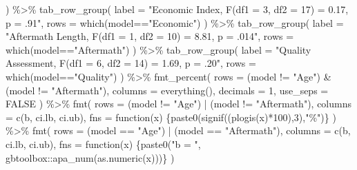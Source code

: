 \documentclass[
  letterpaper,
  DIV=11,
  numbers=noendperiod]{scrartcl}
\newenvironment{Shaded}{\begin{snugshade}}{\end{snugshade}}
\newcommand{\AttributeTok}[1]{\textcolor[rgb]{0.40,0.45,0.13}{#1}}
\newcommand{\ConstantTok}[1]{\textcolor[rgb]{0.56,0.35,0.01}{#1}}
\newcommand{\ControlFlowTok}[1]{\textcolor[rgb]{0.00,0.23,0.31}{#1}}
\newcommand{\DecValTok}[1]{\textcolor[rgb]{0.68,0.00,0.00}{#1}}
\newcommand{\FunctionTok}[1]{\textcolor[rgb]{0.28,0.35,0.67}{#1}}
\newcommand{\NormalTok}[1]{\textcolor[rgb]{0.00,0.23,0.31}{#1}}
\newcommand{\SpecialCharTok}[1]{\textcolor[rgb]{0.37,0.37,0.37}{#1}}
\newcommand{\StringTok}[1]{\textcolor[rgb]{0.13,0.47,0.30}{#1}}
\begin{document}
\begin{Shaded}
\begin{Highlighting}[]
\NormalTok{  ) }\SpecialCharTok{\%\textgreater{}\%}
    \FunctionTok{tab\_row\_group}\NormalTok{(}
    \AttributeTok{label =} \StringTok{"Economic Index, F(df1 = 3, df2 = 17) = 0.17, p = .91"}\NormalTok{,}
    \AttributeTok{rows =} \FunctionTok{which}\NormalTok{(model}\SpecialCharTok{==}\StringTok{"Economic"}\NormalTok{)}
\NormalTok{  ) }\SpecialCharTok{\%\textgreater{}\%}
    \FunctionTok{tab\_row\_group}\NormalTok{(}
    \AttributeTok{label =} \StringTok{"Aftermath Length, F(df1 = 1, df2 = 10) = 8.81, p = .014"}\NormalTok{,}
    \AttributeTok{rows =} \FunctionTok{which}\NormalTok{(model}\SpecialCharTok{==}\StringTok{"Aftermath"}\NormalTok{)}
\NormalTok{  ) }\SpecialCharTok{\%\textgreater{}\%}
  \FunctionTok{tab\_row\_group}\NormalTok{(}
    \AttributeTok{label =} \StringTok{"Quality Assessment, F(df1 = 6, df2 = 14) = 1.69, p = .20"}\NormalTok{,}
    \AttributeTok{rows =} \FunctionTok{which}\NormalTok{(model}\SpecialCharTok{==}\StringTok{"Quality"}\NormalTok{)}
\NormalTok{  ) }\SpecialCharTok{\%\textgreater{}\%}
   \FunctionTok{fmt\_percent}\NormalTok{(}
    \AttributeTok{rows     =}\NormalTok{ (model }\SpecialCharTok{!=} \StringTok{"Age"}\NormalTok{) }\SpecialCharTok{\&}\NormalTok{ (model }\SpecialCharTok{!=} \StringTok{"Aftermath"}\NormalTok{),}
    \AttributeTok{columns  =} \FunctionTok{everything}\NormalTok{(),}
    \AttributeTok{decimals =} \DecValTok{1}\NormalTok{,}
    \AttributeTok{use\_seps =} \ConstantTok{FALSE}
\NormalTok{  ) }\SpecialCharTok{\%\textgreater{}\%}
  \FunctionTok{fmt}\NormalTok{(}
    \AttributeTok{rows     =}\NormalTok{ (model }\SpecialCharTok{!=} \StringTok{"Age"}\NormalTok{) }\SpecialCharTok{|}\NormalTok{ (model }\SpecialCharTok{!=} \StringTok{"Aftermath"}\NormalTok{),}
    \AttributeTok{columns  =} \FunctionTok{c}\NormalTok{(b, ci.lb, ci.ub),}
    \AttributeTok{fns      =} \ControlFlowTok{function}\NormalTok{(x) \{}\FunctionTok{paste0}\NormalTok{(}\FunctionTok{signif}\NormalTok{((}\FunctionTok{plogis}\NormalTok{(x)}\SpecialCharTok{*}\DecValTok{100}\NormalTok{),}\DecValTok{3}\NormalTok{),}\StringTok{"\%"}\NormalTok{)\}}
\NormalTok{  ) }\SpecialCharTok{\%\textgreater{}\%}
   \FunctionTok{fmt}\NormalTok{(}
    \AttributeTok{rows     =}\NormalTok{ (model }\SpecialCharTok{==} \StringTok{"Age"}\NormalTok{) }\SpecialCharTok{|}\NormalTok{ (model }\SpecialCharTok{==} \StringTok{"Aftermath"}\NormalTok{),}
    \AttributeTok{columns  =} \FunctionTok{c}\NormalTok{(b, ci.lb, ci.ub),}
    \AttributeTok{fns      =} \ControlFlowTok{function}\NormalTok{(x) \{}\FunctionTok{paste0}\NormalTok{(}\StringTok{"b = "}\NormalTok{, gbtoolbox}\SpecialCharTok{::}\FunctionTok{apa\_num}\NormalTok{(}\FunctionTok{as.numeric}\NormalTok{(x)))\}}
\NormalTok{  )}
\end{Highlighting}
\end{Shaded}
\end{document}
